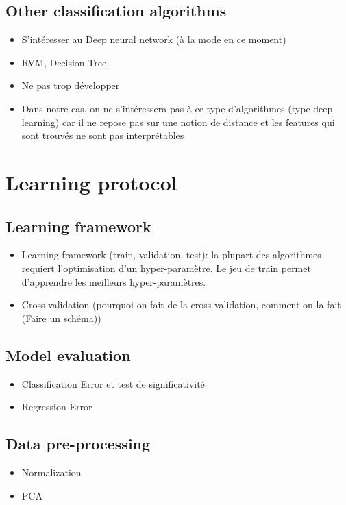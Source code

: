 \subsection{Other classification algorithms}
\begin{itemize}
	\item S'intéresser au Deep neural network (à la mode en ce moment)
	\item RVM, Decision Tree, 
	\item Ne pas trop développer
	\item Dans notre cas, on ne s'intéressera pas à ce type d'algorithmes (type deep learning) car il ne repose pas sur une notion de distance et les features qui sont trouvés ne sont pas interprétables
\end{itemize}
\section{Learning protocol}
\subsection{Learning framework}
\begin{itemize}
	\item Learning framework (train, validation, test): la plupart des algorithmes requiert l'optimisation d'un hyper-paramètre. Le jeu de train permet d'apprendre les meilleurs hyper-paramètres.
	\item Cross-validation (pourquoi on fait de la cross-validation, comment on la fait (Faire un schéma))
\end{itemize}	

\subsection{Model evaluation}
\begin{itemize}
	\item Classification Error et test de significativité
	\item Regression Error
\end{itemize}

\subsection{Data pre-processing}
\begin{itemize}
	\item Normalization
	\item PCA
\end{itemize}

